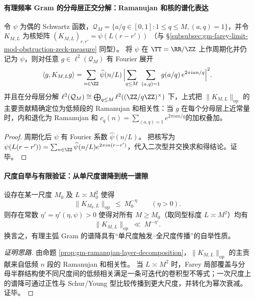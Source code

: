\paragraph{有理频率 Gram 的分母层正交分解：Ramanujan 和核的谱化表达}
\begin{proposition}\label{prop:gm-ramanujan-layer-decomposition}
令 \(\psi\) 为偶的 Schwartz 函数，\(\mathcal{Q}_M=\{a/q\in[0,1]:1\le q\le M,(a,q)=1\}\)，并令
\(
K_{M,L}
\)
为核矩阵
\(
(K_{M,L})_{r,r'}=\psi(L(r-r'))
\)
（与 \S\ref{subsubsec:gm-farey-limit-mod-obstruction-zeck-measure} 同型）。
将 \(\psi\) 在 \(\TT=\RR/\ZZ\) 上作周期化并仍记为 \(\psi\)，则对任意 \(g\in\ell^2(\mathcal{Q}_M)\) 有 Fourier 展开
\[
\langle g,K_{M,L}g\rangle
=\sum_{n\in\ZZ}\widehat\psi(n/L)\,
\Bigl|\sum_{q\le M}\ \sum_{(a,q)=1} g(a/q)\,e^{2\pi i an/q}\Bigr|^2.
\]
并且在分母层分解 \(\ell^2(\mathcal{Q}_M)\cong\bigoplus_{q\le M}\ell^2((\ZZ/q\ZZ)^\times)\) 下，上式把 \(\|K_{M,L}\|_{\mathrm{op}}\) 的主要贡献精确定位为低频段的 Ramanujan 和相关性：当 \(g\) 在每个分母层上近常量时，内和退化为 Ramanujan 和
\(
c_q(n)=\sum_{(a,q)=1}e^{2\pi i an/q}
\)的加权叠加。
\end{proposition}

\begin{proof}
周期化后 \(\psi\) 有 Fourier 系数 \(\widehat\psi(n/L)\)。
把核写为 \(\psi(L(r-r'))=\sum_{n\in\ZZ}\widehat\psi(n/L)e^{2\pi i n(r-r')}\)，代入二次型并交换求和得结论。证毕。
\end{proof}

\paragraph{尺度自举与有限验证：从单尺度谱降到统一谱隙}
\begin{proposition}\label{prop:gm-scale-bootstrap-gram}
设存在某一尺度 \(M_0\) 及 \(L\asymp M_0^2\) 使得
\[
\|K_{M_0,L}\|_{\mathrm{op}}\ \le\ M_0^{-\eta}
\qquad(\eta>0).
\]
则存在常数 \(\eta'=\eta'(\eta,\psi)>0\) 使得对所有 \(M\ge M_0\)（取同型标度 \(L\asymp M^2\)）均有
\[
\|K_{M,L}\|_{\mathrm{op}}\ \ll\ M^{-\eta'}.
\]
换言之，有理主弧 Gram 的谱降具有“单尺度触发--全尺度传播”的自举性质。
\end{proposition}

\begin{proof}[证明思路]
由命题 \ref{prop:gm-ramanujan-layer-decomposition}，\(\|K_{M,L}\|_{\mathrm{op}}\) 的主贡献来自低频 \(n\) 段的 Ramanujan 和相关性。
当 \(L\asymp M^2\) 时，Farey 局部覆盖与分母半群结构使不同尺度间的低频相关满足一条可迭代的卷积型不等式；一次尺度上的谱降可通过正性与 Schur/Young 型比较传播到更大尺度，并转化为幂次衰减。证毕。
\end{proof}

